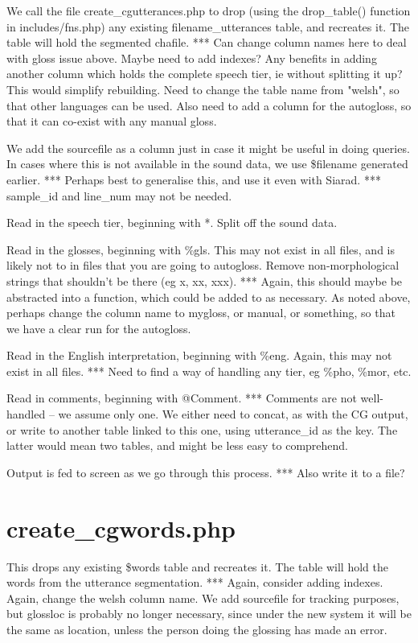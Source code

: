 \documentclass[a4paper,10pt]{article}
\begin{document}
We call the file create\_cgutterances.php to drop (using the drop\_table() function in includes/fns.php) any existing filename\_utterances table, and recreates it.  The table will hold the segmented chafile.
*** Can change column names here to deal with gloss issue above.  Maybe need to add indexes?  Any benefits in adding another column which holds the complete speech tier, ie without splitting it up?  This would simplify rebuilding.  Need to change the table name from "welsh", so that other languages can be used.  Also need to add a column for the autogloss, so that it can co-exist with any manual gloss.

We add the sourcefile as a column just in case it might be useful in doing queries.  In cases where this is not available in the sound data, we use \$filename generated earlier. *** Perhaps best to generalise this, and use it even with Siarad. *** sample\_id and line\_num may not be needed.

Read in the speech tier, beginning with *.  Split off the sound data.

Read in the glosses, beginning with \%gls.  This may not exist in all files, and is likely not to in files that you are going to autogloss.  Remove non-morphological strings that shouldn't be there (eg x, xx, xxx).
*** Again, this should maybe be abstracted into a function, which could be added to as necessary.  As noted above, perhaps change the column name to mygloss, or manual, or something, so that we have a clear run for the autogloss.

Read in the English interpretation, beginning with \%eng.  Again, this may not exist in all files.
*** Need to find a way of handling any tier, eg \%pho, \%mor, etc.   

Read in comments, beginning with @Comment.  
*** Comments are not well-handled -- we assume only one.  We either need to concat, as with the CG output, or write to another table linked to this one, using utterance\_id as the key.  The latter would mean two tables, and might be less easy to comprehend.

Output is fed to screen as we go through this process.
*** Also write it to a file?


\section{create\_cgwords.php}
\label{sec:words}

This drops any existing \$words table and recreates it.  The table will hold the words from the utterance segmentation.
*** Again, consider adding indexes.  Again, change the welsh column name.  We add sourcefile for tracking purposes, but glossloc is probably no longer necessary, since under the new system it will be the same as location, unless the person doing the glossing has made an error.
\end{document}
